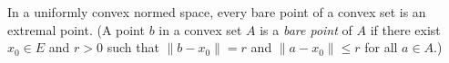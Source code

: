 In a uniformly convex normed space, every bare point of a convex set is an extremal point. (A point $b$ in a convex set $A$ is a \textit{bare point} of $A$ if there exist $x_0 \in E$ and $r > 0$ such that $\|b - x_0\| = r$ and $\|a - x_0\| \leq r$ for all $a \in A$.)
